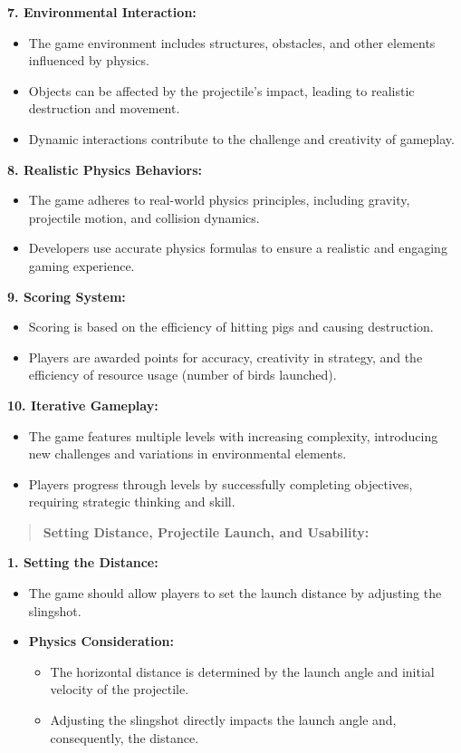\documentclass[
]{article}
\begin{document}
\textbf{7. Environmental Interaction:}

\begin{itemize}
\item
  The game environment includes structures, obstacles, and other
  elements influenced by physics.
\item
  Objects can be affected by the projectile's impact, leading to
  realistic destruction and movement.
\item
  Dynamic interactions contribute to the challenge and creativity of
  gameplay.
\end{itemize}

\textbf{8. Realistic Physics Behaviors:}

\begin{itemize}
\item
  The game adheres to real-world physics principles, including gravity,
  projectile motion, and collision dynamics.
\item
  Developers use accurate physics formulas to ensure a realistic and
  engaging gaming experience.
\end{itemize}

\textbf{9. Scoring System:}

\begin{itemize}
\item
  Scoring is based on the efficiency of hitting pigs and causing
  destruction.
\item
  Players are awarded points for accuracy, creativity in strategy, and
  the efficiency of resource usage (number of birds launched).
\end{itemize}

\textbf{10. Iterative Gameplay:}

\begin{itemize}
\item
  The game features multiple levels with increasing complexity,
  introducing new challenges and variations in environmental elements.
\item
  Players progress through levels by successfully completing objectives,
  requiring strategic thinking and skill.
\end{itemize}

\begin{quote}
\textbf{Setting Distance, Projectile Launch, and Usability:}
\end{quote}

\textbf{1. Setting the Distance:}

\begin{itemize}
\item
  The game should allow players to set the launch distance by adjusting
  the slingshot.
\item
  \textbf{Physics Consideration:}

  \begin{itemize}
  \item
    The horizontal distance is determined by the launch angle and
    initial velocity of the projectile.
  \item
    Adjusting the slingshot directly impacts the launch angle and,
    consequently, the distance.
  \end{itemize}
\end{itemize}
\end{document}
